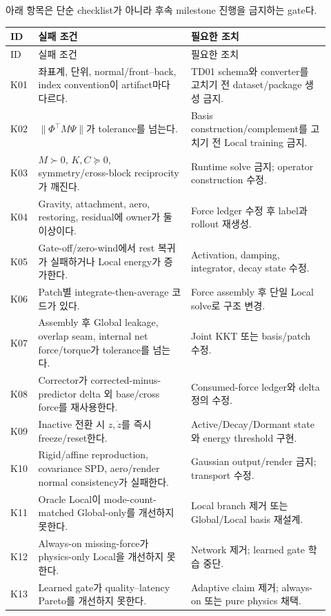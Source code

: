 \documentclass[10pt,a4paper]{article}
\begin{document}
아래 항목은 단순 checklist가 아니라 후속 milestone 진행을 금지하는 gate다.

\begin{longtable}{L{0.06\linewidth}L{0.45\linewidth}L{0.41\linewidth}}
\toprule
ID & 실패 조건 & 필요한 조치 \\
\midrule
\endfirsthead
\toprule
ID & 실패 조건 & 필요한 조치 \\
\midrule
\endhead
K01 & 좌표계, 단위, normal/front--back, index convention이 artifact마다 다르다. & TD01 schema와 converter를 고치기 전 dataset/package 생성 금지. \\
K02 & \(\|\Phi^\top M\Psi\|\)가 tolerance를 넘는다. & Basis construction/complement를 고치기 전 Local training 금지. \\
K03 & \(M\succ0\), \(K,C\succeq0\), symmetry/cross-block reciprocity가 깨진다. & Runtime solve 금지; operator construction 수정. \\
K04 & Gravity, attachment, aero, restoring, residual에 owner가 둘 이상이다. & Force ledger 수정 후 label과 rollout 재생성. \\
K05 & Gate-off/zero-wind에서 rest 복귀가 실패하거나 Local energy가 증가한다. & Activation, damping, integrator, decay state 수정. \\
K06 & Patch별 integrate-then-average 코드가 있다. & Force assembly 후 단일 Local solve로 구조 변경. \\
K07 & Assembly 후 Global leakage, overlap seam, internal net force/torque가 tolerance를 넘는다. & Joint KKT 또는 basis/patch 수정. \\
K08 & Corrector가 corrected-minus-predictor delta 외 base/cross force를 재사용한다. & Consumed-force ledger와 delta 정의 수정. \\
K09 & Inactive 전환 시 \(z,\dot z\)를 즉시 freeze/reset한다. & Active/Decay/Dormant state와 energy threshold 구현. \\
K10 & Rigid/affine reproduction, covariance SPD, aero/render normal consistency가 실패한다. & Gaussian output/render 금지; transport 수정. \\
K11 & Oracle Local이 mode-count-matched Global-only를 개선하지 못한다. & Local branch 제거 또는 Global/Local basis 재설계. \\
K12 & Always-on missing-force가 physics-only Local을 개선하지 못한다. & Network 제거; learned gate 학습 중단. \\
K13 & Learned gate가 quality--latency Pareto를 개선하지 못한다. & Adaptive claim 제거; always-on 또는 pure physics 채택. \\
\bottomrule
\end{longtable}
\end{document}
